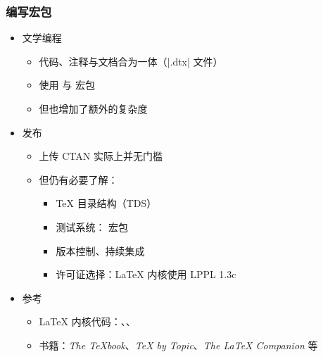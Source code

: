 \begin{frame}[fragile]
\frametitle{编写宏包}
\begin{itemize}
  \item<+-> 文学编程

    \begin{itemize}
      \item 代码、注释与文档合为一体（|.dtx| 文件）
      \item 使用  与  宏包
      \item 但也增加了额外的复杂度
    \end{itemize}

  \item<+-> 发布

    \begin{itemize}
      \item 上传 CTAN 实际上并无门槛
      \item 但仍有必要了解：

        \begin{itemize}
          \item \TeX{} 目录结构（TDS）
          \item 测试系统： 宏包
          \item 版本控制、持续集成
          \item 许可证选择：\LaTeX{} 内核使用 LPPL 1.3c
        \end{itemize}
    \end{itemize}

  \item<+-> 参考

    \begin{itemize}
      \item \LaTeX{} 内核代码：、、
      \item 书籍：\textit{The \TeX book}、\textit{\TeX{} by Topic}、\textit{The \LaTeX{} Companion} 等
    \end{itemize}
\end{itemize}
\end{frame}

